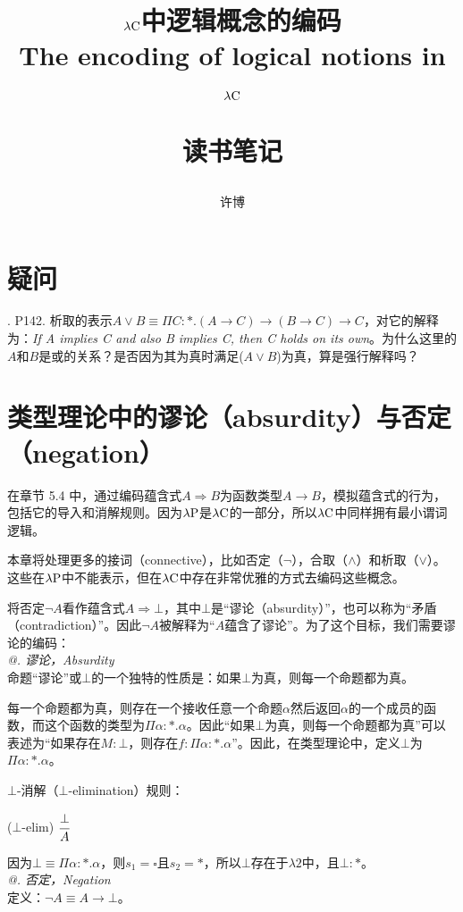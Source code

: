 \documentclass[UTF8]{article}
\title{$\lambda{\rm C}$中逻辑概念的编码\\The encoding of logical notions in $\lambda{\rm C}$\\[2ex]\begin{large}读书笔记\end{large}}
\author{许博}
\date{}
\makeatletter
\newcommand{\Rmnum}[1]{\expandafter\@slowromancap\romannumeral #1@}
\makeatother
\begin{document}
\maketitle
	\section{疑问}
	. P142. 析取的表示$A\lor B\equiv\Pi C:*.(A\rightarrow C)\rightarrow(B\rightarrow C)\rightarrow C$，对它的解释为：\textit{If A implies C and also B implies C, then C holds on its own}。为什么这里的$A$和$B$是或的关系？是否因为其为真时满足($A\lor B$)为真，算是强行解释吗？

	\section{类型理论中的谬论（absurdity）与否定（negation）}
	\noindent
	在章节 5.4 中，通过编码蕴含式$A\Rightarrow B$为函数类型$A\rightarrow B$，模拟蕴含式的行为，包括它的导入和消解规则。因为$\lambda{\rm P}$是$\lambda{\rm C}$的一部分，所以$\lambda{\rm C}$中同样拥有最小谓词逻辑。
	
		本章将处理更多的接词（connective），比如否定（$\neg$），合取（$\land$）和析取（$\lor$）。这些在$\lambda{\rm P}$中不能表示，但在$\lambda{\rm C}$中存在非常优雅的方式去编码这些概念。
		
		将否定$\neg A$看作蕴含式$A\Rightarrow \bot$，其中$\bot$是“谬论（absurdity）”，也可以称为“矛盾（contradiction）”。因此$\neg A$被解释为“$A$蕴含了谬论”。为了这个目标，我们需要谬论的编码：\\
		
	\noindent
	\textit{\Rmnum{1}. 谬论，Absurdity}\\
	命题“谬论”或$\bot$的一个独特的性质是：如果$\bot$为真，则每一个命题都为真。
	
		每一个命题都为真，则存在一个接收任意一个命题$\alpha$然后返回$\alpha$的一个成员的函数，而这个函数的类型为$\Pi\alpha:*.\alpha$。因此“如果$\bot$为真，则每一个命题都为真”可以表述为“如果存在$M:\bot$，则存在$f:\Pi\alpha:*.\alpha$”。因此，在类型理论中，定义$\bot$为$\Pi\alpha:*.\alpha$。
		
		$\bot$-消解（$\bot$-elimination）规则：
		
		($\bot$-elim) $\cfrac{\bot}{A}$
		
		因为$\bot\equiv\Pi\alpha:*.\alpha$，则$s_1=\square$且$s_2=*$，所以$\bot$存在于$\lambda{2}$中，且$\bot:*$。\\
		
	\noindent
	\textit{\Rmnum{2}. 否定，Negation}\\
	定义：$\neg A\equiv A\rightarrow\bot$。
	
\end{document}
